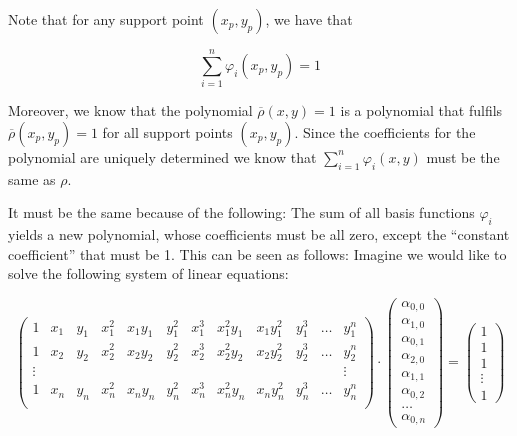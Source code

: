\documentclass{article}
\renewcommand{\phi}{\varphi}
\begin{document}
Note that for any support point $(x_p,y_p)$, we have that

\begin{equation}
  \sum_{i=1}^n \phi_i(x_p,y_p) = 1
\end{equation}

Moreover, we know that the polynomial $\overline{\rho}(x,y)=1$ is a polynomial that fulfils $\overline{\rho}(x_p,y_p)=1$ for all support points $(x_p,y_p)$. Since the coefficients for the polynomial are uniquely determined we know that $\sum_{i=1}^n \phi_i(x,y)$ must be the same as $\rho$.

It must be the same because of the following: The sum of all basis functions $\phi_i$ yields a new polynomial, whose coefficients must be all zero, except the ``constant coefficient'' that must be 1. This can be seen as follows: Imagine we would like to solve the following system of linear equations:

\setcounter{MaxMatrixCols}{20}

\begin{equation*}
  \begin{pmatrix}
    1 & x_1 & y_1 & x_1^2 & x_1 y_1 & y_1^2 & x_1^3 & x_1^2 y_1 & x_1 y_1^2 & y_1^3 & \dots & y_1^n \\
    1 & x_2 & y_2 & x_2^2 & x_2 y_2 & y_2^2 & x_2^3 & x_2^2 y_2 & x_2 y_2^2 & y_2^3 & \dots & y_2^n \\
    \vdots & &&&&&&&&&& \vdots \\
    1 & x_n & y_n & x_n^2 & x_n y_n & y_n^2 & x_n^3 & x_n^2 y_n & x_n y_n^2 & y_n^3 & \dots & y_n^n \\
  \end{pmatrix} \cdot
  \begin{pmatrix}
    \alpha_{0,0} \\
    \alpha_{1,0} \\
    \alpha_{0,1} \\
    \alpha_{2,0} \\
    \alpha_{1,1} \\
    \alpha_{0,2} \\
    \hdots \\
    \alpha_{0,n}
  \end{pmatrix} =
  \begin{pmatrix}
    1 \\ 1 \\ 1 \\ \vdots \\ 1
  \end{pmatrix}
\end{equation*}
\end{document}
